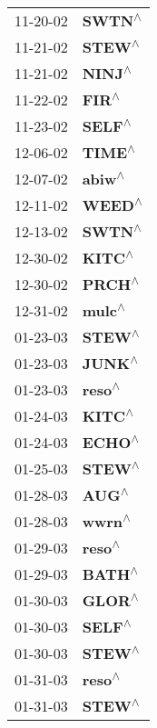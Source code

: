 \begin{supertabular}{p{0.08\textwidth}p{0.2\textwidth}}
 11-20-02 &    \textbf{SWTN\textsuperscript{$\wedge$}} \\
 11-21-02 &    \textbf{STEW\textsuperscript{$\wedge$}} \\
 11-21-02 &    \textbf{NINJ\textsuperscript{$\wedge$}} \\
 11-22-02 &     \textbf{FIR\textsuperscript{$\wedge$}} \\
 11-23-02 &    \textbf{SELF\textsuperscript{$\wedge$}} \\
 12-06-02 &    \textbf{TIME\textsuperscript{$\wedge$}} \\
 12-07-02 &    \textbf{abiw\textsuperscript{$\wedge$}} \\
 12-11-02 &    \textbf{WEED\textsuperscript{$\wedge$}} \\
 12-13-02 &    \textbf{SWTN\textsuperscript{$\wedge$}} \\
 12-30-02 &    \textbf{KITC\textsuperscript{$\wedge$}} \\
 12-30-02 &    \textbf{PRCH\textsuperscript{$\wedge$}} \\
 12-31-02 &    \textbf{mulc\textsuperscript{$\wedge$}} \\
 01-23-03 &    \textbf{STEW\textsuperscript{$\wedge$}} \\
 01-23-03 &    \textbf{JUNK\textsuperscript{$\wedge$}} \\
 01-23-03 &    \textbf{reso\textsuperscript{$\wedge$}} \\
 01-24-03 &    \textbf{KITC\textsuperscript{$\wedge$}} \\
 01-24-03 &    \textbf{ECHO\textsuperscript{$\wedge$}} \\
 01-25-03 &    \textbf{STEW\textsuperscript{$\wedge$}} \\
 01-28-03 &     \textbf{AUG\textsuperscript{$\wedge$}} \\
 01-28-03 &    \textbf{wwrn\textsuperscript{$\wedge$}} \\
 01-29-03 &    \textbf{reso\textsuperscript{$\wedge$}} \\
 01-29-03 &    \textbf{BATH\textsuperscript{$\wedge$}} \\
 01-30-03 &    \textbf{GLOR\textsuperscript{$\wedge$}} \\
 01-30-03 &    \textbf{SELF\textsuperscript{$\wedge$}} \\
 01-30-03 &    \textbf{STEW\textsuperscript{$\wedge$}} \\
 01-31-03 &    \textbf{reso\textsuperscript{$\wedge$}} \\
 01-31-03 &    \textbf{STEW\textsuperscript{$\wedge$}} \\

\end{supertabular}

